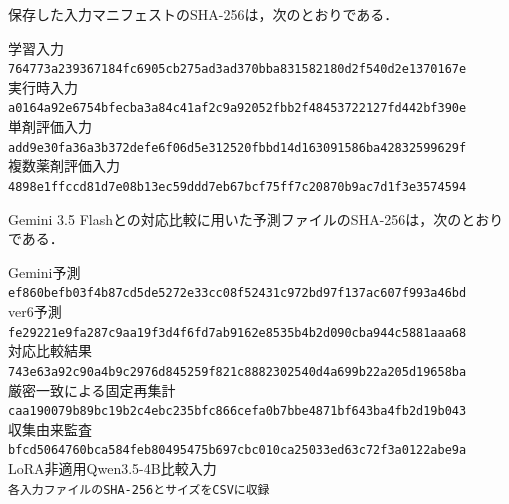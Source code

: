 \documentclass[uplatex,dvipdfmx]{jsarticle}
\begin{document}
保存した入力マニフェストのSHA-256は，次のとおりである．
\begin{flushleft}
\small
学習入力\ \\[-0.5mm]
\texttt{764773a239367184fc6905cb275ad3ad370bba831582180d2f540d2e1370167e}\\[1mm]
実行時入力\ \\[-0.5mm]
\texttt{a0164a92e6754bfecba3a84c41af2c9a92052fbb2f48453722127fd442bf390e}\\[1mm]
単剤評価入力\ \\[-0.5mm]
\texttt{add9e30fa36a3b372defe6f06d5e312520fbbd14d163091586ba42832599629f}\\[1mm]
複数薬剤評価入力\ \\[-0.5mm]
\texttt{4898e1ffccd81d7e08b13ec59ddd7eb67bcf75ff7c20870b9ac7d1f3e3574594}
\end{flushleft}

Gemini 3.5 Flashとの対応比較に用いた予測ファイルのSHA-256は，次のとおりである．
\begin{flushleft}
\small
Gemini予測\ \\[-0.5mm]
\texttt{ef860befb03f4b87cd5de5272e33cc08f52431c972bd97f137ac607f993a46bd}\\[1mm]
ver6予測\ \\[-0.5mm]
\texttt{fe29221e9fa287c9aa19f3d4f6fd7ab9162e8535b4b2d090cba944c5881aaa68}\\[1mm]
対応比較結果\ \\[-0.5mm]
\texttt{743e63a92c90a4b9c2976d845259f821c\allowbreak 8882302540d4a699b22a205d19658ba}\\[1mm]
厳密一致による固定再集計\ \\[-0.5mm]
\texttt{caa190079b89bc19b2c4ebc235bfc866c\allowbreak efa0b7bbe4871bf643ba4fb2d19b043}\\[1mm]
収集由来監査\ \\[-0.5mm]
\texttt{bfcd5064760bca584feb80495475b697c\allowbreak bc010ca25033ed63c72f3a0122abe9a}\\[1mm]
LoRA非適用Qwen3.5-4B比較入力\ \\[-0.5mm]
\texttt{各入力ファイルのSHA-256とサイズをCSVに収録}
\end{flushleft}
\end{document}
